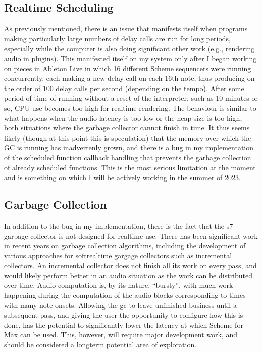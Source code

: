 \documentclass[letterpaper,10pt,english]{sphinxmanual}
\begin{document}
\subsection{Real\sphinxhyphen{}time Scheduling}
\label{\detokenize{conclusion:real-time-scheduling}}
\sphinxAtStartPar
As previously mentioned, there is an issue that manifests itself when programs
making particularly large numbers of delay calls are run for long periods, especially while
the computer is also doing significant other work (e.g., rendering audio in plugins).
This manifested itself on my system only after I began working on pieces in Ableton
Live in which 16 different Scheme sequencers were running concurrently, each
making a new delay call on each 16th note, thus producing on the order of 100 delay
calls per second (depending on the tempo).
After some period of time of running without a reset of the interpreter, such as 10 minutes or
so, CPU use becomes too high for realtime rendering.
The behaviour is similar to what happens when the audio latency is too low or
the heap size is too high, both situations where the garbage collector cannot finish in time.
It thus seems likely (though at this point this is speculation) that the memory
over which the GC is running has inadvertenly grown, and there is a bug in my
implementation of the scheduled function callback handling that prevents the garbage
collection of already scheduled functions.
This is the most serious limitation at the moment and is something on which I will be actively
working in the summer of 2023.


\subsection{Garbage Collection}
\label{\detokenize{conclusion:garbage-collection}}
\sphinxAtStartPar
In addition to the bug in my implementation, there is the fact that the s7 garbage
collector is not designed for realtime use. There has been significant work
in recent years on garbage collection algorithms, including the development
of various approaches for soft\sphinxhyphen{}realtime gargage collectors such as incremental collectors.
An incremental collector does not finish
all its work on every pass, and would likely perform better in an audio situation
as the work can be distributed over time. Audio computation is, by its nature,
“bursty”, with much work happening during the computation of the audio blocks
corresponding to times with many note onsets. Allowing the gc to leave unfinished
business until a subsequent pass, and giving the user the opportunity to configure
how this is done, has the potential to significantly lower
the latency at which Scheme for Max can be used.
This, however, will require major development work, and should be considered
a long\sphinxhyphen{}term potential area of exploration.
\end{document}
